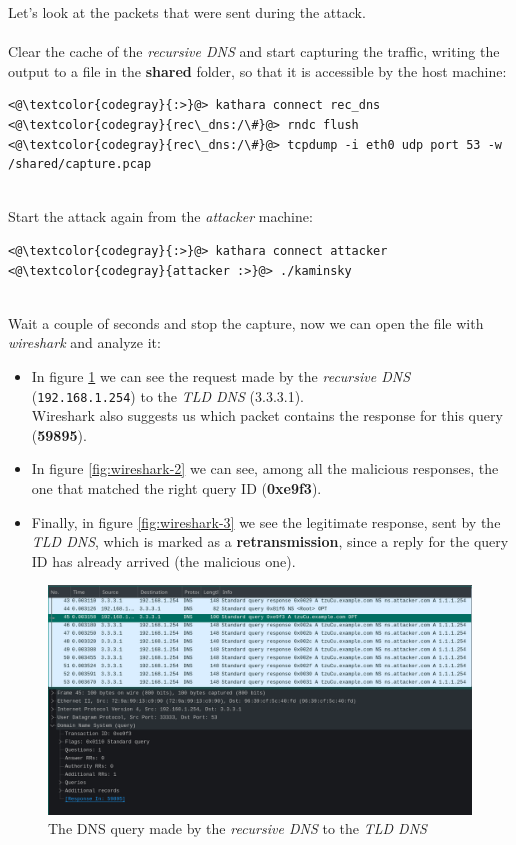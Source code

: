 \documentclass[11pt,a4paper]{article}
\begin{document}
Let's look at the packets that were sent during the attack.
\\
\\
\noindent
Clear the cache of the \emph{recursive DNS} and start capturing the traffic,
writing the output to a file in the \textbf{shared} folder,
so that it is accessible by the host machine:

\begin{lstlisting}
<@\textcolor{codegray}{:>}@> kathara connect rec_dns
<@\textcolor{codegray}{rec\_dns:/\#}@> rndc flush
<@\textcolor{codegray}{rec\_dns:/\#}@> tcpdump -i eth0 udp port 53 -w /shared/capture.pcap
\end{lstlisting}

\noindent
\\
Start the attack again from the \emph{attacker} machine:
\begin{lstlisting}
<@\textcolor{codegray}{:>}@> kathara connect attacker
<@\textcolor{codegray}{attacker :>}@> ./kaminsky
\end{lstlisting}

\noindent
\\
Wait a couple of seconds and stop the capture, now we can open the file with \emph{wireshark}
and analyze it:

\begin{itemize}
  \item In figure \ref*{fig:wireshark-1} we can see the request made by the
        \emph{recursive DNS} (\texttt{192.168.1.254}) to the \emph{TLD DNS}
        (3.3.3.1).\\
        Wireshark also suggests us which packet contains the response for
        this query (\textbf{59895}).
  \item In figure \ref{fig:wireshark-2} we can see, among all the malicious responses,
        the one that matched the right query ID (\textbf{0xe9f3}).
  \item Finally, in figure \ref{fig:wireshark-3} we see the legitimate response, sent by
        the \emph{TLD DNS}, which is marked as a \textbf{retransmission}, since a reply
        for the query ID has already arrived (the malicious one).
\end{itemize}

\begin{figure}[h!]
  \includegraphics[width=\linewidth]{wireshark-1.png}
  \caption{The DNS query made by the \emph{recursive DNS} to the \emph{TLD DNS}}
  \label{fig:wireshark-1}
\end{figure}
\end{document}
